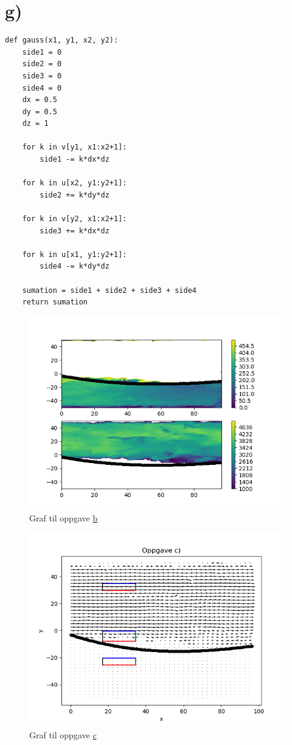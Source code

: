 \documentclass[a4paper,10pt,norsk]{article}
\begin{document}
	\section*{g)}\label{ass:g}
\begin{lstlisting}
def gauss(x1, y1, x2, y2):
    side1 = 0
    side2 = 0
    side3 = 0
    side4 = 0
    dx = 0.5
    dy = 0.5
    dz = 1

    for k in v[y1, x1:x2+1]:
        side1 -= k*dx*dz

    for k in u[x2, y1:y2+1]:
        side2 += k*dy*dz

    for k in v[y2, x1:x2+1]:
        side3 += k*dx*dz

    for k in u[x1, y1:y2+1]:
        side4 -= k*dy*dz

    sumation = side1 + side2 + side3 + side4
    return sumation

\end{lstlisting}
	\newpage
	\begin{figure}[h!]
		\centering
		\caption{Graf til oppgave \hyperref[ass:b]{b}}
		\label{fig:b}
		\includegraphics{oppgave_b.png}
	\end{figure}
	\begin{figure}[h!]
		\centering
		\caption{Graf til oppgave \hyperref[ass:c]{c}} 
		\label{fig:c}
		\includegraphics{oppgave_c.png}
	\end{figure}
\end{document}
